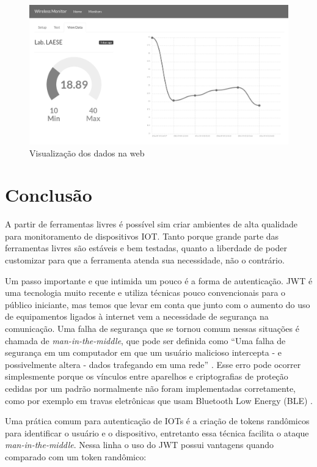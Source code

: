 \begin{figure}[h]
    \centering
    \includegraphics[scale=0.35]{img/temperature-show-grey.png}
    \caption{Visualização dos dados na web} \label{fig:view-monitor}
\end{figure}

\section{Conclusão}\label{conclusuxe3o}

A partir de ferramentas livres é possível sim criar ambientes de alta
qualidade para monitoramento de dispositivos IOT. Tanto porque grande
parte das ferramentas livres são estáveis e bem testadas, quanto a
liberdade de poder customizar para que a ferramenta atenda sua
necessidade, não o contrário.

Um passo importante e que intimida um pouco é a forma de autenticação.
JWT é uma tecnologia muito recente e utiliza técnicas pouco
convencionais para o público iniciante, mas temos que levar em conta que
junto com o aumento do uso de equipamentos ligados à internet vem a
necessidade de segurança na comunicação. Uma falha de segurança que se
tornou comum nessas situações é chamada de \emph{man-in-the-middle}, que
pode ser definida como ``Uma falha de segurança em um computador em que
um usuário malicioso intercepta - e possivelmente altera - dados
trafegando em uma rede'' \cite{wordspy:2002}. Esse erro pode ocorrer
simplesmente porque os vínculos entre aparelhos e criptografias de
proteção cedidas por um padrão normalmente não foram implementadas
corretamente, como por exemplo em travas eletrônicas que usam Bluetooth
Low Energy (BLE) \cite{spring:2016}.

Uma prática comum para autenticação de IOTs é a criação de tokens
randômicos para identificar o usuário e o dispositivo, entretanto essa
técnica facilita o ataque \emph{man-in-the-middle}. Nessa linha o uso do
JWT possui vantagens quando comparado com um token randômico:

